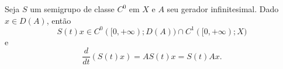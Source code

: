 
\begin{theorem}\label{th-der}
Seja $S$ um semigrupo de classe $C^0$ em $X$ e $A$ seu gerador infinitesimal. Dado $x\in D(A)$, então 
\[S(t)x\in C^0([0,+\infty);D(A))\cap C^1([0,+\infty);X)\]
e
\[\frac{d}{dt}\left(S(t)x\right)=AS(t)x=S(t)Ax.\]
\end{theorem}

